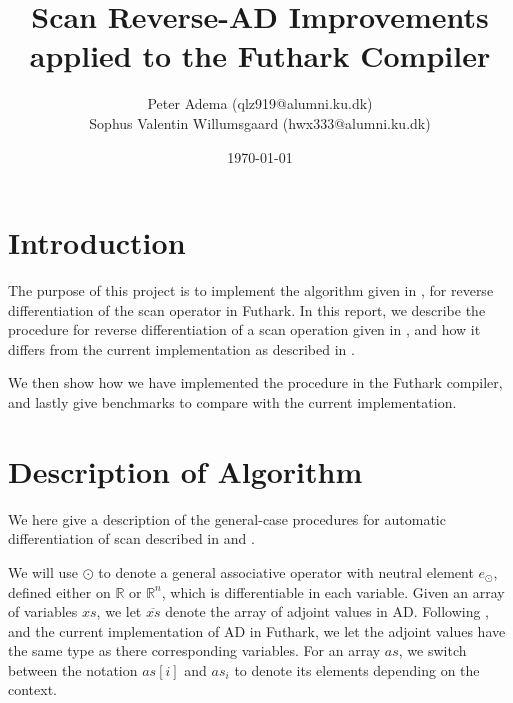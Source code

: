 \documentclass{article}
\title{Scan Reverse-AD Improvements applied to the Futhark Compiler}
\author{Peter Adema (qlz919@alumni.ku.dk)\\
Sophus Valentin Willumsgaard (hwx333@alumni.ku.dk)}
\date{\today}
\newcommand{\xs}{xs}
\newcommand{\xo}{\overline{xs}}
\begin{document}
\maketitle
\tableofcontents
\section{Introduction}
The purpose of this project is to implement the algorithm given in \cite{PPAD}, for reverse
differentiation of the scan operator in Futhark.
In this report,
we describe the procedure for reverse differentiation of a
scan operation given in \cite{PPAD},
and how it differs from the current implementation as described in
\cite{Futhark}.

We then show how we have implemented the procedure in the Futhark compiler,
and lastly give benchmarks to compare with the current implementation.
\section{Description of Algorithm}
We here give a description of the general-case procedures for automatic differentiation of
scan described in \cite{PPAD} and \cite{Futhark}.

We will use \(\odot\) to denote a general associative operator with neutral
element \(e_{\odot}\), defined either on \(\mathbb{R}\) or \(\mathbb{R}^{n}\),
which is differentiable in each variable.
Given an array of variables \(\xs\),
we let \(\xo\) denote the array of adjoint values in AD.
Following \cite{PPAD},
and the current implementation of AD in Futhark,
we let the adjoint values have the same type as there corresponding variables.
For an array \(as\),
we switch between the notation \(as[i]\) and \(as_{i}\) to denote its elements
depending on the context.
\end{document}
